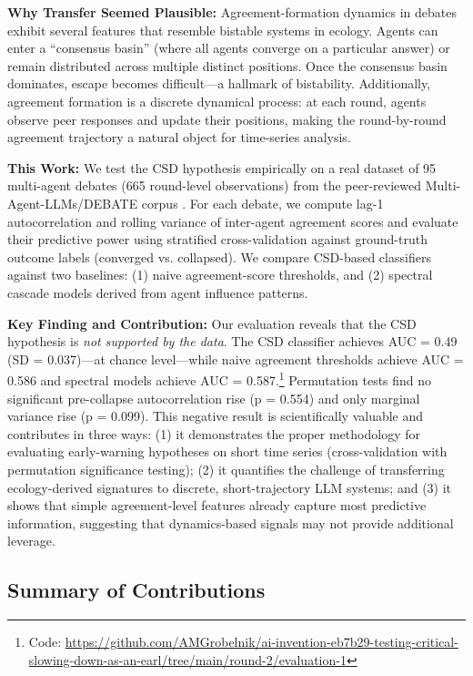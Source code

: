 \documentclass[11pt,letterpaper]{article}
\begin{document}
\textbf{Why Transfer Seemed Plausible:} Agreement-formation dynamics in debates exhibit several features that resemble bistable systems in ecology. Agents can enter a ``consensus basin'' (where all agents converge on a particular answer) or remain distributed across multiple distinct positions. Once the consensus basin dominates, escape becomes difficult---a hallmark of bistability. Additionally, agreement formation is a discrete dynamical process: at each round, agents observe peer responses and update their positions, making the round-by-round agreement trajectory a natural object for time-series analysis.

\textbf{This Work:} We test the CSD hypothesis empirically on a real dataset of 95 multi-agent debates (665 round-level observations) from the peer-reviewed Multi-Agent-LLMs/DEBATE corpus \citep{Min2025Debate}. For each debate, we compute lag-1 autocorrelation and rolling variance of inter-agent agreement scores and evaluate their predictive power using stratified cross-validation against ground-truth outcome labels (converged vs. collapsed). We compare CSD-based classifiers against two baselines: (1) naive agreement-score thresholds, and (2) spectral cascade models derived from agent influence patterns.

\textbf{Key Finding and Contribution:} Our evaluation reveals that the CSD hypothesis is \emph{not supported by the data}. The CSD classifier achieves AUC = 0.49 (SD = 0.037)---at chance level---while naive agreement thresholds achieve AUC = 0.586 and spectral models achieve AUC = 0.587.\footnote{Code: \url{https://github.com/AMGrobelnik/ai-invention-eb7b29-testing-critical-slowing-down-as-an-earl/tree/main/round-2/evaluation-1}} Permutation tests find no significant pre-collapse autocorrelation rise (p = 0.554) and only marginal variance rise (p = 0.099). This negative result is scientifically valuable and contributes in three ways: (1) it demonstrates the proper methodology for evaluating early-warning hypotheses on short time series (cross-validation with permutation significance testing); (2) it quantifies the challenge of transferring ecology-derived signatures to discrete, short-trajectory LLM systems; and (3) it shows that simple agreement-level features already capture most predictive information, suggesting that dynamics-based signals may not provide additional leverage.

\subsection{Summary of Contributions}
\end{document}
